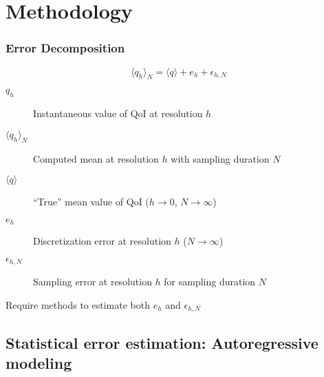 \documentclass[mathserif]{beamer}
\newcommand{\rarrow}{\rightarrow}
\begin{document}
\section{Methodology}

\begin{frame}
\frametitle{Error Decomposition}

\vfill

\begin{equation*}
  \langle q_h \rangle_{N} = \langle q \rangle + e_h + \epsilon_{h,N}
\end{equation*}

\vfill

\begin{description}
\item[$q_h$] Instantaneous value of QoI at resolution $h$
\item[$\langle q_h \rangle_{N}$] Computed mean at resolution $h$ with sampling duration $N$
\item[$\langle q \rangle$] ``True'' mean value of QoI ($h \rarrow 0$, $N \rarrow \infty$)
\item[$e_h$] Discretization error at resolution $h$ ($N \rarrow \infty$)
\item[$\epsilon_{h,N}$] Sampling error at resolution $h$ for sampling duration $N$
\end{description}

\vfill

Require methods to estimate both $e_h$ and $\epsilon_{h,N}$

\vfill

\end{frame}

\subsection{Statistical error estimation: Autoregressive modeling}
\end{document}
